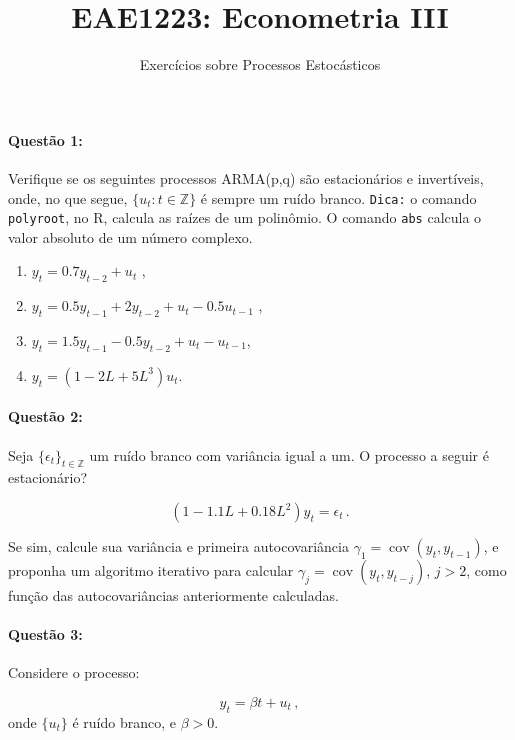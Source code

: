 \documentclass[10pt,a4paper]{article}
\title{\large EAE1223: Econometria III}
\author{\normalsize Exercícios sobre Processos Estocásticos}
\date{}
\begin{document}
	\maketitle
	\paragraph{Questão 1:}  Verifique se os seguintes processos ARMA(p,q) são estacionários e invertíveis, onde, no que segue, $\{u_t:t\in \mathbb{Z}\}$ é sempre um ruído branco. \texttt{Dica:} o comando \texttt{polyroot}, no R, calcula as raízes de um polinômio. O comando \texttt{abs} calcula o valor absoluto de um número complexo.
	
	\begin{enumerate}
		\item $y_t = 0.7 y_{t-2} + u_t$  ,
		\item $y_t = 0.5 y_{t-1} + 2y_{t-2} + u_t - 0.5 u_{t-1}$  ,
		\item $y_t = 1.5 y_{t-1}  - 0.5 y_{t-2} + u_t  - u_{t-1}$,
		\item $y_t = (1 - 2 L + 5 L^3)u_t$.
	\end{enumerate}
	
	\paragraph{Questão 2:} Seja $\{\epsilon_t\}_{t\in \mathbb{Z}}$ um ruído branco com variância igual a um. O processo a seguir é estacionário?
	
	$$(1-1.1L + 0.18L^2)y_t = \epsilon_t \, .$$
	
	Se sim, calcule sua variância e primeira autocovariância $\gamma_1 = \operatorname{cov}(y_t, y_{t-1})$, e proponha um algoritmo iterativo para calcular $\gamma_j = \operatorname{cov}(y_t, y_{t-j})$, $j>2$, como função das autocovariâncias anteriormente calculadas.

		\paragraph{Questão 3:} Considere o processo:
		
		$$y_t = \beta t + u_t \, ,$$
		onde $\{u_t\}$ é ruído branco, e $\beta > 0$.
		
\end{document}
